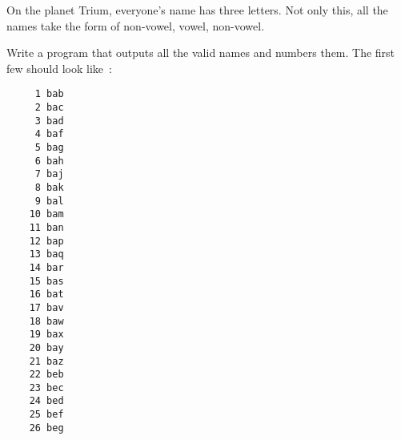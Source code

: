 
On the planet Trium, everyone's name has three letters.
Not only this, all the names take the form of
non-vowel, vowel, non-vowel.

\begin{exercise}
Write a program that outputs all the valid names and
numbers them.
The first few should look like~:
\begin{verbatim}
     1 bab
     2 bac
     3 bad
     4 baf
     5 bag
     6 bah
     7 baj
     8 bak
     9 bal
    10 bam
    11 ban
    12 bap
    13 baq
    14 bar
    15 bas
    16 bat
    17 bav
    18 baw
    19 bax
    20 bay
    21 baz
    22 beb
    23 bec
    24 bed
    25 bef
    26 beg
\end{verbatim}
\end{exercise}
